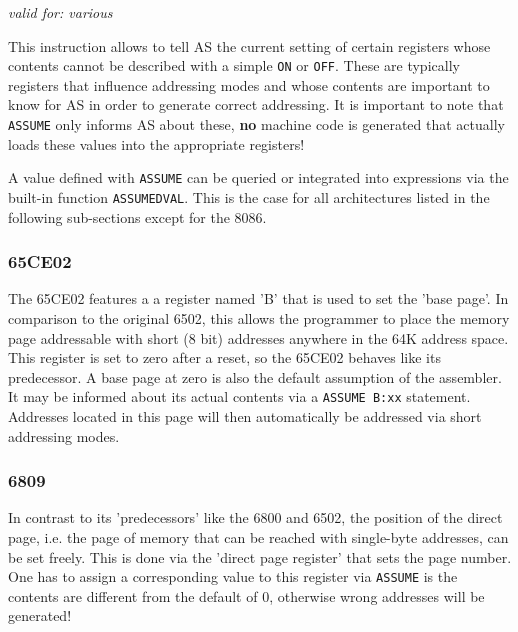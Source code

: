 \documentclass[12pt,twoside]{report}
\newcommand{\bb}[1]{{\bf #1}}
\newcommand{\tty}[1]{{\tt #1}}
\begin{document}
{\em valid for: various}

This instruction allows to tell AS the current setting of certain
registers whose contents cannot be described with a simple \tty{ON} or
\tty{OFF}.  These are typically registers that influence addressing modes
and whose contents are important to know for AS in order to generate
correct addressing.  It is important to note that \tty{ASSUME} only
informs AS about these, \bb{no} machine code is generated that actually
loads these values into the appropriate registers!

A value defined with \tty{ASSUME} can be queried or integrated
into expressions via the built-in function \tty{ASSUMEDVAL}.
This is the case for all architectures listed in the following
sub-sections except for the 8086.


\subsubsection{65CE02}

The 65CE02 features a a register named 'B' that is used to set the 'base page'.
In comparison to the original 6502, this allows the programmer to place the 
memory page addressable with short (8 bit) addresses anywhere in the 64K address
space.  This register is set to zero after a reset, so the 65CE02 behaves like
its predecessor.  A base page at zero is also the default assumption of the
assembler.  It may be informed about its actual contents via a \tty{ASSUME B:xx}
statement.  Addresses located in this page will then automatically be addressed
via short addressing modes.


\subsubsection{6809}

In contrast to its 'predecessors' like the 6800 and 6502, the position of
the direct page, i.e. the page of memory that can be reached with
single-byte addresses, can be set freely.  This is done via the 'direct
page register' that sets the page number.  One has to assign a
corresponding value to this register via \tty{ASSUME} is the contents are
different from the default of 0, otherwise wrong addresses will be
generated!
\end{document}
